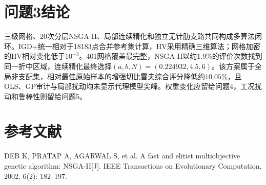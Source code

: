 \documentclass[UTF8,a4paper,11pt]{ctexart}
\begin{document}
\section{问题3结论}
三级网格、20次分层NSGA-II、局部连续精化和独立无针肋支路共同构成多算法闭环。IGD+统一相对于18183点合并参考集计算，HV采用精确三维算法；网格加密的HV相对变化低于$10^{-3}$。401网格覆盖最完整，NSGA-II以约$1.9\%$的评价次数找到同一折中区域，连续精化最终选择$(a,b,N)=(0.224932,4.5,6)$。该方案属于全局非支配集，相对最佳原始样本的增强切比雪夫综合评分降低约$10.05\%$，且OLS、GP审计与局部扰动均未显示代理模型尖峰。权重变化应留给问题4，工况扰动和鲁棒性则留给问题5。

\section*{参考文献}
\noindent[1] DEB K, PRATAP A, AGARWAL S, et al. A fast and elitist multiobjective genetic algorithm: NSGA-II[J]. IEEE Transactions on Evolutionary Computation, 2002, 6(2): 182--197.
\end{document}

